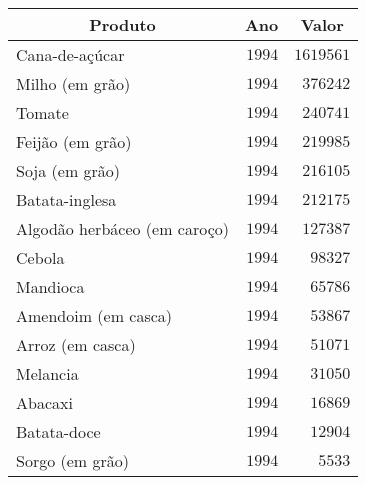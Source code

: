 \begin{table}[!tbp]
\begin{center}
\begin{tabular}{lrr}
\hline\hline
\multicolumn{1}{c}{Produto}&\multicolumn{1}{c}{Ano}&\multicolumn{1}{c}{Valor}\tabularnewline
\hline
Cana-de-açúcar&$1994$&$1619561$\tabularnewline
Milho (em grão)&$1994$&$ 376242$\tabularnewline
Tomate&$1994$&$ 240741$\tabularnewline
Feijão (em grão)&$1994$&$ 219985$\tabularnewline
Soja (em grão)&$1994$&$ 216105$\tabularnewline
Batata-inglesa&$1994$&$ 212175$\tabularnewline
Algodão herbáceo (em caroço)&$1994$&$ 127387$\tabularnewline
Cebola&$1994$&$  98327$\tabularnewline
Mandioca&$1994$&$  65786$\tabularnewline
Amendoim (em casca)&$1994$&$  53867$\tabularnewline
Arroz (em casca)&$1994$&$  51071$\tabularnewline
Melancia&$1994$&$  31050$\tabularnewline
Abacaxi&$1994$&$  16869$\tabularnewline
Batata-doce&$1994$&$  12904$\tabularnewline
Sorgo (em grão)&$1994$&$   5533$\tabularnewline
\hline
\end{tabular}\end{center}

\end{table}
